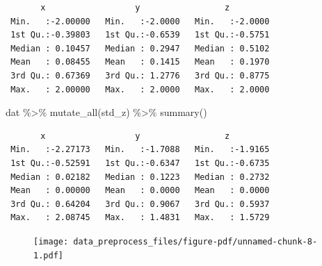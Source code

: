\documentclass[
  letterpaper,
  DIV=11,
  numbers=noendperiod]{scrreprt}
\newenvironment{Shaded}{\begin{snugshade}}{\end{snugshade}}
\newcommand{\AttributeTok}[1]{\textcolor[rgb]{0.40,0.45,0.13}{#1}}
\newcommand{\CommentTok}[1]{\textcolor[rgb]{0.37,0.37,0.37}{#1}}
\newcommand{\DecValTok}[1]{\textcolor[rgb]{0.68,0.00,0.00}{#1}}
\newcommand{\FunctionTok}[1]{\textcolor[rgb]{0.28,0.35,0.67}{#1}}
\newcommand{\NormalTok}[1]{\textcolor[rgb]{0.00,0.23,0.31}{#1}}
\newcommand{\SpecialCharTok}[1]{\textcolor[rgb]{0.37,0.37,0.37}{#1}}
\newcommand{\StringTok}[1]{\textcolor[rgb]{0.13,0.47,0.30}{#1}}
\begin{document}
\begin{verbatim}
       x                  y                 z          
 Min.   :-2.00000   Min.   :-2.0000   Min.   :-2.0000  
 1st Qu.:-0.39803   1st Qu.:-0.6539   1st Qu.:-0.5751  
 Median : 0.10457   Median : 0.2947   Median : 0.5102  
 Mean   : 0.08455   Mean   : 0.1415   Mean   : 0.1970  
 3rd Qu.: 0.67369   3rd Qu.: 1.2776   3rd Qu.: 0.8775  
 Max.   : 2.00000   Max.   : 2.0000   Max.   : 2.0000  
\end{verbatim}

\begin{Shaded}
\begin{Highlighting}[]
\NormalTok{dat }\SpecialCharTok{\%\textgreater{}\%} \FunctionTok{mutate\_all}\NormalTok{(std\_z) }\SpecialCharTok{\%\textgreater{}\%} \FunctionTok{summary}\NormalTok{()}
\end{Highlighting}
\end{Shaded}

\begin{verbatim}
       x                  y                 z          
 Min.   :-2.27173   Min.   :-1.7088   Min.   :-1.9165  
 1st Qu.:-0.52591   1st Qu.:-0.6347   1st Qu.:-0.6735  
 Median : 0.02182   Median : 0.1223   Median : 0.2732  
 Mean   : 0.00000   Mean   : 0.0000   Mean   : 0.0000  
 3rd Qu.: 0.64204   3rd Qu.: 0.9067   3rd Qu.: 0.5937  
 Max.   : 2.08745   Max.   : 1.4831   Max.   : 1.5729  
\end{verbatim}

\begin{Shaded}
\end{Shaded}

\begin{figure}[H]

{\centering \texttt{[image: data\_preprocess\_files/figure-pdf/unnamed-chunk-8-1.pdf]}

}

\end{figure}
\end{document}
